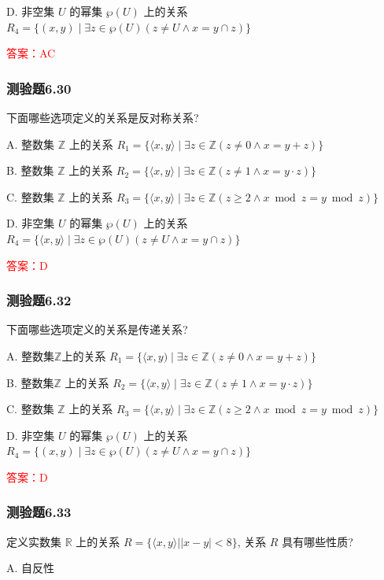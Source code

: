 \documentclass[UTF8, heading=true]{ctexart}
\begin{document}
D. 非空集 $U$ 的幂集 $\wp(U)$ 上的关系 $R_4=\{(x, y) \mid \exists z \in \wp(U)(z \neq U \wedge x=y \cap z)\}$

\textcolor{red}{答案：AC}

\subsubsection{测验题6.30}

下面哪些选项定义的关系是反对称关系?

A. 整数集 $\mathbb{Z}$ 上的关系 $R_1=\{\langle x, y\rangle \mid \exists z \in \mathbb{Z}(z \neq 0 \wedge x=y+z)\}$

B. 整数集 $\mathbb{Z}$ 上的关系 $R_2=\{\langle x, y\rangle \mid \exists z \in \mathbb{Z}(z \neq 1 \wedge x=y \cdot z)\}$

C. 整数集 $\mathbb{Z}$ 上的关系 $R_3=\{\langle x, y\rangle \mid \exists z \in \mathbb{Z}(z \geq 2 \wedge x \bmod z=y \bmod z)\}$

D. 非空集 $U$ 的幂集 $\wp(U)$ 上的关系 $R_4=\{\langle x, y\rangle \mid \exists z \in \wp(U)(z \neq U \wedge x=y \cap z)\}$

\textcolor{red}{答案：D}

\subsubsection{测验题6.32}

下面哪些选项定义的关系是传递关系?

A. 整数集$\mathbb{Z}$上的关系 $R_1=\{\langle x, y) \mid \exists z \in \mathbb{Z}(z \neq 0 \wedge x=y+z)\}$

B. 整数集$\mathbb{Z}$ 上的关系 $R_2=\{\langle x, y\rangle \mid \exists z \in \mathbb{Z}(z \neq 1 \wedge x=y \cdot z)\}$

C. 整数集 $\mathbb{Z}$ 上的关系 $R_3=\{\langle x, y\rangle \mid \exists z \in \mathbb{Z}(z \geq 2 \wedge x \bmod z=y \bmod z)\}$

D. 非空集 $U$ 的幂集 $\wp(U)$ 上的关系 $R_4=\{(x, y) \mid \exists z \in \wp(U)(z \neq U \wedge x=y \cap z)\}$

\textcolor{red}{答案：D}


\subsubsection{测验题6.33}
定义实数集 $\mathbb{R}$ 上的关系 $R=\{\langle x, y\rangle| | x-y \mid<8\}$, 关系 $R$ 具有哪些性质?

A. 
自反性
\end{document}
